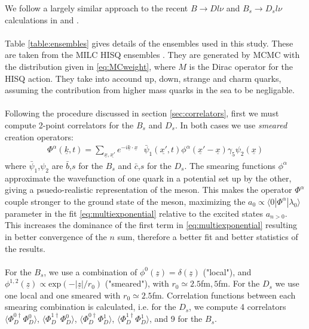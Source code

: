 We follow a largely similar approach to the recent $B\to Dl\nu$ and $B_s\to D_sl\nu$ calculations in \cite{Na:2015kha} and \cite{Monahan:2017uby}.
\\ \\
Table \ref{table:ensembles} gives details of the ensembles used in this study. These are taken from the MILC HISQ ensembles \cite{Bazavov:2012xda}. They are generated by MCMC with the distribution given in \eqref{eq:MCweight}, where $M$ is the Dirac operator for the HISQ action. They take into accound up, down, strange and charm quarks, assuming the contribution from higher mass quarks in the sea to be negligable.
\\ \\
Following the procedure discussed in section \ref{sec:correlators}, first we must compute 2-point correlators for the $B_s$ and $D_s$. In both cases we use \textit{smeared} creation operators:
\begin{align}
	\Phi^{\alpha}(\underline{k},t) = \sum_{\underline{x},\underline{x'}} e^{-i\underline{k}\cdot\underline{x}} \text{ } \bar{\psi}_1(\underline{x'},t)\phi^{\alpha}(\underline{x}'-\underline{x}) \gamma_5 \psi_2(\underline{x})
\end{align}
where $\bar{\psi}_1$,$\psi_2$ are $\bar{b}$,$s$ for the $B_s$ and $\bar{c}$,$s$ for the $D_s$. The smearing functions $\phi^{\alpha}$ approximate the wavefunction of one quark in a potential set up by the other, giving a psuedo-realistic representation of the meson. This makes the operator $\Phi^{\alpha}$ couple stronger to the ground state of the meson, maximizing the $a_0 \propto \langle0 |\Phi^{\alpha}|\lambda_0\rangle$ parameter in the fit \eqref{eq:multiexponential} relative to the excited states $a_{n>0}$. This increases the dominance of the first term in \eqref{eq:multiexponential} resulting in better convergence of the $n$ sum, therefore a better fit and better statistics of the results.
\\ \\
For the $B_s$, we use a combination of $\phi^0(\underline{z})=\delta(\underline{z})$ ("local"), and $\phi^{1,2}(\underline{z}) \propto \text{exp}(-|\underline{z}|/r_0)$ ("smeared"), with $r_0 \simeq 2.5$fm$, 5$fm. For the $D_s$ we use one local and one smeared with $r_0\simeq2.5$fm. Correlation functions between each smearing combination is calculated, i.e. for the $D_s$, we compute 4 correlators $\langle \Phi^{0\dagger}_D\Phi_D^0 \rangle$, $\langle \Phi^{1\dagger}_D\Phi_D^0 \rangle$, $\langle \Phi^{0\dagger}_D\Phi_D^1 \rangle$, $\langle \Phi^{1\dagger}_D\Phi_D^1 \rangle$, and 9 for the $B_s$.
